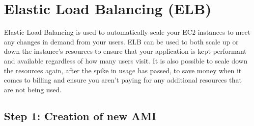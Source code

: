 \chapter{Elastic Load Balancing (ELB)}\label{ch:elastic-load-balancing}

Elastic Load Balancing is used to automatically scale your EC2 instances to meet any changes in demand from your users.
ELB can be used to both scale up or down the instance's resources to ensure that your application is kept performant and
available regardless of how many users visit.
It is also possible to scale down the resources again, after the spike in usage has passed, to save money when it comes
to billing and ensure you aren't paying for any additional resources that are not being used.

\section{Step 1: Creation of new AMI}

